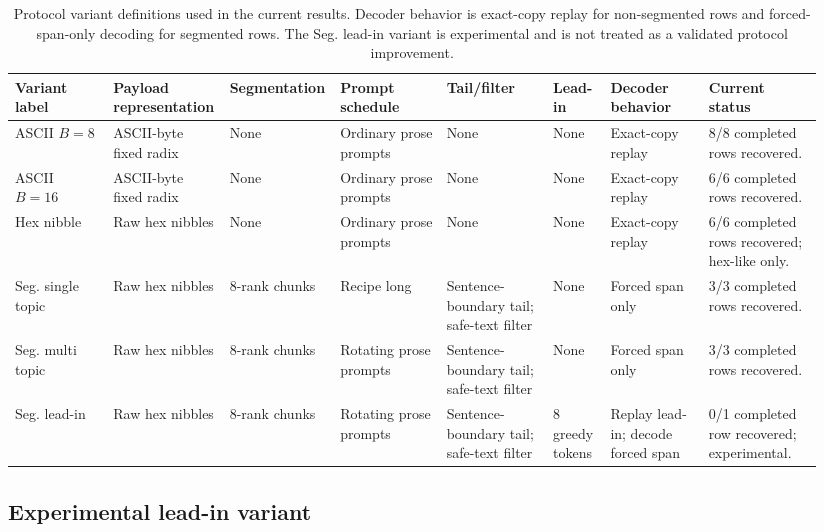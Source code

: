 \documentclass[fleqn,10pt]{wlscirep}
\begin{document}
\begin{table}[H]
\centering
\scriptsize
\setlength{\tabcolsep}{2pt}
\begin{tabular}{L{0.12\linewidth} L{0.13\linewidth} L{0.10\linewidth} L{0.13\linewidth} L{0.13\linewidth} L{0.07\linewidth} L{0.12\linewidth} L{0.14\linewidth}}
\toprule
Variant label & Payload representation & Segmentation & Prompt schedule & Tail/filter & Lead-in & Decoder behavior & Current status \\
\midrule
ASCII \(B=8\) & ASCII-byte fixed radix & None & Ordinary prose prompts & None & None & Exact-copy replay & 8/8 completed rows recovered. \\
ASCII \(B=16\) & ASCII-byte fixed radix & None & Ordinary prose prompts & None & None & Exact-copy replay & 6/6 completed rows recovered. \\
Hex nibble & Raw hex nibbles & None & Ordinary prose prompts & None & None & Exact-copy replay & 6/6 completed rows recovered; hex-like only. \\
Seg. single topic & Raw hex nibbles & 8-rank chunks & Recipe long & Sentence-boundary tail; safe-text filter & None & Forced span only & 3/3 completed rows recovered. \\
Seg. multi topic & Raw hex nibbles & 8-rank chunks & Rotating prose prompts & Sentence-boundary tail; safe-text filter & None & Forced span only & 3/3 completed rows recovered. \\
Seg. lead-in & Raw hex nibbles & 8-rank chunks & Rotating prose prompts & Sentence-boundary tail; safe-text filter & 8 greedy tokens & Replay lead-in; decode forced span & 0/1 completed row recovered; experimental. \\
\bottomrule
\end{tabular}
\caption{\label{tab:s1}Protocol variant definitions used in the current results. Decoder behavior is exact-copy replay for non-segmented rows and forced-span-only decoding for segmented rows. The Seg. lead-in variant is experimental and is not treated as a validated protocol improvement.}
\end{table}



\subsection*{Experimental lead-in variant}
\end{document}
